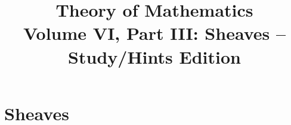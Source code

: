 \documentclass[11pt,a4paper,oneside,openany]{book}
\title{Theory of Mathematics\\[0.5em]\Large Volume VI, Part III: Sheaves -- Study/Hints Edition}
\author{}\date{}
\begin{document}
\maketitle\clearpage
\frontmatter\tableofcontents\mainmatter
\part{Sheaves}






\end{document}
